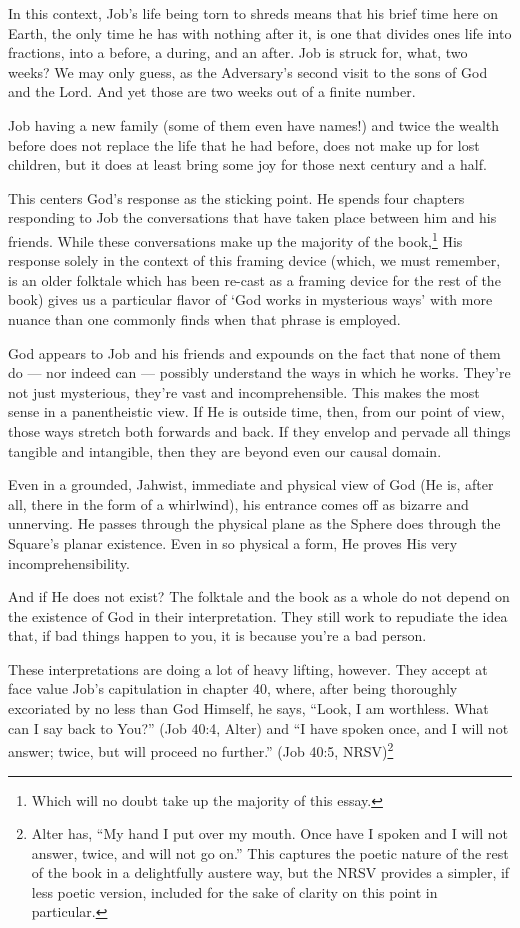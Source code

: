 In this context, Job's life being torn to shreds means that his brief time here on Earth, the only time he has with nothing after it, is one that divides ones life into fractions, into a before, a during, and an after. Job is struck for, what, two weeks? We may only guess, as the Adversary's second visit to the sons of God and the Lord. And yet those are two weeks out of a finite number.

Job having a new family (some of them even have names!) and twice the wealth before does not replace the life that he had before, does not make up for lost children, but it does at least bring some joy for those next century and a half.

This centers God's response as the sticking point. He spends four chapters responding to Job the conversations that have taken place between him and his friends. While these conversations make up the majority of the book,\footnote{Which will no doubt take up the majority of this essay.} His response solely in the context of this framing device (which, we must remember, is an older folktale which has been re-cast as a framing device for the rest of the book) gives us a particular flavor of `God works in mysterious ways' with more nuance than one commonly finds when that phrase is employed.

God appears to Job and his friends and expounds on the fact that none of them do --- nor indeed can --- possibly understand the ways in which he works. They're not just mysterious, they're vast and incomprehensible. This makes the most sense in a panentheistic view. If He is outside time, then, from our point of view, those ways stretch both forwards and back. If they envelop and pervade all things tangible and intangible, then they are beyond even our causal domain.

Even in a grounded, Jahwist, immediate and physical view of God (He is, after all, there in the form of a whirlwind), his entrance comes off as bizarre and unnerving. He passes through the physical plane as the Sphere does through the Square's planar existence. Even in so physical a form, He proves His very incomprehensibility.

And if He does not exist? The folktale and the book as a whole do not depend on the existence of God in their interpretation. They still work to repudiate the idea that, if bad things happen to you, it is because you're a bad person.

These interpretations are doing a lot of heavy lifting, however. They accept at face value Job's capitulation in chapter 40, where, after being thoroughly excoriated by no less than God Himself, he says, ``Look, I am worthless. What can I say back to You?'' (Job 40:4, Alter) and ``I have spoken once, and I will not answer; twice, but will proceed no further.'' (Job 40:5, NRSV)\footnote{Alter has, ``My hand I put over my mouth. Once have I spoken and I will not answer, twice, and will not go on.'' This captures the poetic nature of the rest of the book in a delightfully austere way, but the NRSV provides a simpler, if less poetic version, included for the sake of clarity on this point in particular.}

